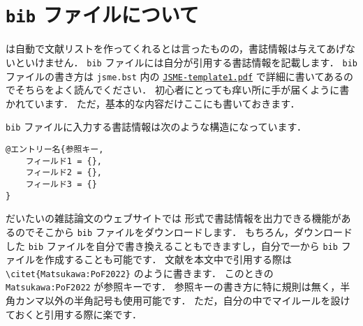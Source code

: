 \section{\texttt{bib} ファイルについて}
\label{sec:bib-file}

\BibTeX は自動で文献リストを作ってくれるとは言ったものの，書誌情報は与えてあげないといけません．
\verb|bib| ファイルには自分が引用する書誌情報を記載します．
\verb|bib| ファイルの書き方は \verb|jsme.bst| 内の \href{https://github.com/Yuki-MATSUKAWA/JSME-bst/blob/main/JSME-template1.pdf}{\texttt{JSME-template1.pdf}} で詳細に書いてあるのでそちらをよく読んでください．
\BibTeX 初心者にとっても痒い所に手が届くように書かれています．
ただ，基本的な内容だけここにも書いておきます．

\verb|bib| ファイルに入力する書誌情報は次のような構造になっています．
\begin{tcolorbox}[enhanced, title=\textgt{\texttt{bib} ファイル内の書誌情報の構造}, drop fuzzy shadow]
\begin{verbatim}
@エントリー名{参照キー,
    フィールド1 = {},
    フィールド2 = {},
    フィールド3 = {}
}
\end{verbatim}
\end{tcolorbox}
\noindent
だいたいの雑誌論文のウェブサイトでは \BibTeX 形式で書誌情報を出力できる機能があるのでそこから \verb|bib| ファイルをダウンロードします．
もちろん，ダウンロードした \verb|bib| ファイルを自分で書き換えることもできますし，自分で一から \verb|bib| ファイルを作成することも可能です．
文献を本文中で引用する際は \verb|\citet{Matsukawa:PoF2022}| のように書きます．
このときの \verb|Matsukawa:PoF2022| が参照キーです．
参照キーの書き方に特に規則は無く，半角カンマ以外の半角記号も使用可能です．
ただ，自分の中でマイルールを設けておくと引用する際に楽です．


